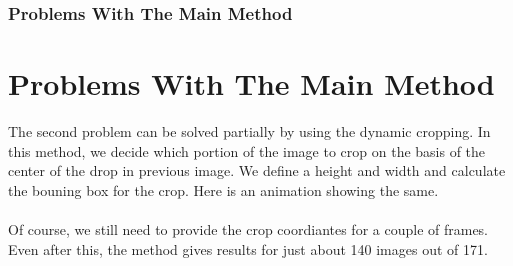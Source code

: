 \documentclass{beamer}
\begin{document}
\begin{frame}
    \frametitle{Problems With The Main Method}
    \section{Problems With The Main Method}
    \small
    The second problem can be solved partially by using the dynamic cropping. In this method, we decide which portion of the image to crop on the basis of the center of the drop in previous image. We define a height and width and calculate the bouning box for the crop. Here is an animation showing the same.\\
    \centering
    \\
    \small
    Of course, we still need to provide the crop coordiantes for a couple of frames. Even after this, the method gives results for just about 140 images out of 171.
\end{frame}
\end{document}
